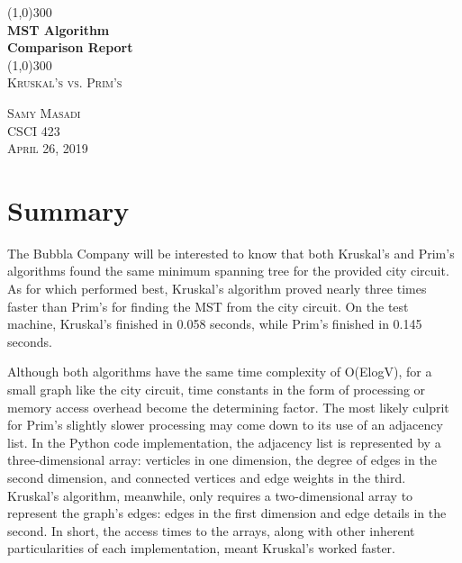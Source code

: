 \documentclass{article}
\begin{document}
\begin{titlepage}
    \begin{center}
    \line(1,0){300} \\
    [0.2in]
    \huge{\bfseries MST Algorithm\\ Comparison Report} \\
    \line(1,0){300} \\
    [1.5cm]
    \textsc{\LARGE Kruskal's vs. Prim's}\\
    [15cm]
    \end{center}
    \begin{flushright}
    \textsc{\large Samy Masadi\\
    CSCI 423\\
    April 26, 2019}
    \end{flushright}
\end{titlepage}

\tableofcontents
\thispagestyle{empty}
\cleardoublepage

\setcounter{page}{1}

\section{Summary}
\hspace{\parindent}The Bubbla Company will be interested to know that both Kruskal's and Prim's algorithms found the same minimum spanning tree for the provided city circuit. As for which performed best, Kruskal's algorithm proved nearly three times faster than Prim's for finding the MST from the city circuit. On the test machine, Kruskal's finished in 0.058 seconds, while Prim's finished in 0.145 seconds.

Although both algorithms have the same time complexity of O(ElogV), for a small graph like the city circuit, time constants in the form of processing or memory access overhead become the determining factor. The most likely culprit for Prim's slightly slower processing may come down to its use of an adjacency list. In the Python code implementation, the adjacency list is represented by a three-dimensional array: verticles in one dimension, the degree of edges in the second dimension, and connected vertices and edge weights in the third. Kruskal's algorithm, meanwhile, only requires a two-dimensional array to represent the graph's edges: edges in the first dimension and edge details in the second. In short, the access times to the arrays, along with other inherent particularities of each implementation, meant Kruskal's worked faster.
\end{document}
